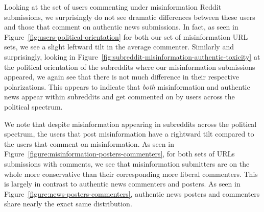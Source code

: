 Looking at the set of users commenting under misinformation Reddit submissions, we surprisingly do not see dramatic differences between these users and those that comment on authentic news submissions. In fact, as seen in Figure~\ref{fig:users-political-orientation} for both our set of misinformation URL sets, we see a slight leftward tilt in the average commenter. Similarly and surprisingly, looking in Figure~\ref{fig:subreddit-misinformation-authentic-toxicity} at the political orientation of the subreddits where our misinformation submissions appeared, we again see that there is not much difference in their respective polarizations. This appears to indicate that \emph{both} misinformation and authentic news appear within subreddits and get commented on by users across the political spectrum.


We note that despite misinformation appearing in subreddits across the political spectrum, the users that post misinformation have a rightward tilt compared to the users that comment on misinformation. As seen in Figure~\ref{figure:misinformation-posters-commenters}, for both sets of URLs submissions with comments, we see that misinformation submitters are on the whole more conservative than their corresponding more liberal commenters. This is largely in contrast to authentic news commenters and posters. As seen in Figure~\ref{figure:news-posters-commenters}, authentic news posters and commenters share nearly the exact same distribution. 




